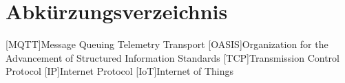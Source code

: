 
\section*{Abkürzungsverzeichnis}
\begin{acronym}[OASIS] %
    [MQTT]{Message Queuing Telemetry Transport}
    [OASIS]{Organization for the Advancement of Structured Information Standards}
    [TCP]{Transmission Control Protocol}
    [IP]{Internet Protocol}
    [IoT]{Internet of Things}
\end{acronym}
